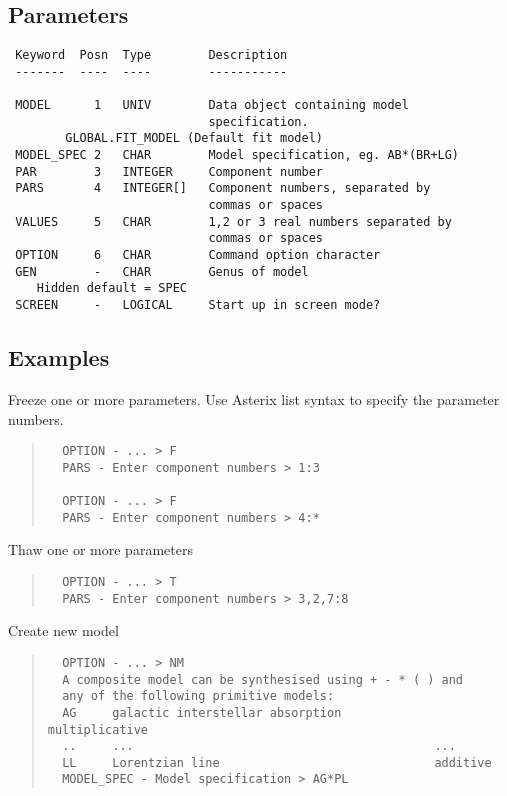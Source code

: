 \documentclass{book}
\renewcommand{\_}{{\tt\char'137}}     %
\begin{document}
\subsection{Parameters}
\begin{verbatim}
 Keyword  Posn  Type        Description
 -------  ----  ----        -----------

 MODEL      1   UNIV        Data object containing model
                            specification.
        GLOBAL.FIT_MODEL (Default fit model)
 MODEL_SPEC 2   CHAR        Model specification, eg. AB*(BR+LG)
 PAR        3   INTEGER     Component number
 PARS       4   INTEGER[]   Component numbers, separated by
                            commas or spaces
 VALUES     5   CHAR        1,2 or 3 real numbers separated by
                            commas or spaces
 OPTION     6   CHAR        Command option character
 GEN        -   CHAR        Genus of model
    Hidden default = SPEC
 SCREEN     -   LOGICAL     Start up in screen mode?

\end{verbatim}\subsection{Examples}
Freeze one or more parameters. Use Asterix list syntax to specify
the parameter numbers.
\begin{quote}\begin{verbatim}
  OPTION - ... > F
  PARS - Enter component numbers > 1:3

  OPTION - ... > F
  PARS - Enter component numbers > 4:*
\end{verbatim}\end{quote}
Thaw one or more parameters
\begin{quote}\begin{verbatim}
  OPTION - ... > T
  PARS - Enter component numbers > 3,2,7:8
\end{verbatim}\end{quote}
Create new model
\begin{quote}\begin{verbatim}
  OPTION - ... > NM
  A composite model can be synthesised using + - * ( ) and
  any of the following primitive models:
  AG     galactic interstellar absorption             multiplicative
  ..     ...                                          ...
  LL     Lorentzian line                              additive
  MODEL_SPEC - Model specification > AG*PL
\end{verbatim}\end{quote}
\end{document}
